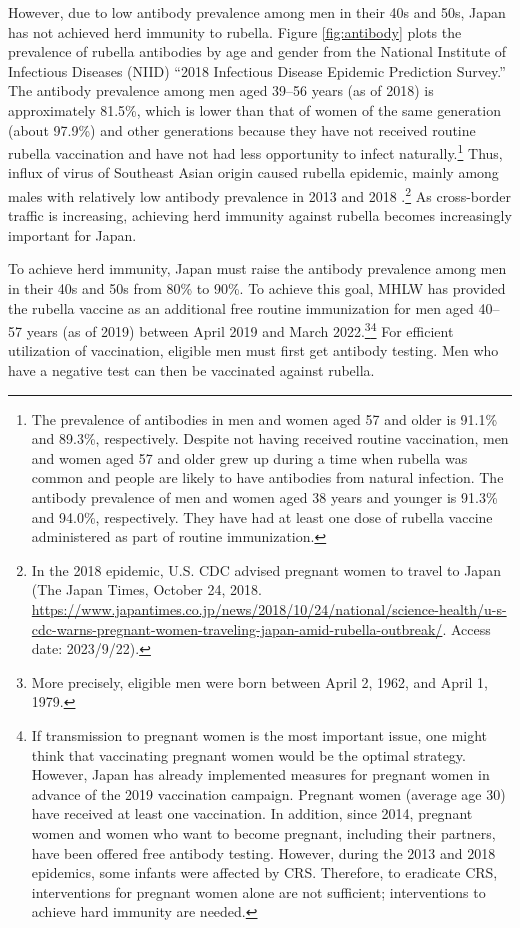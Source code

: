 \documentclass[
]{article}
\begin{document}
However, due to low antibody prevalence among men in their 40s and 50s, Japan has not achieved herd immunity to rubella. Figure \ref{fig:antibody} plots the prevalence of rubella antibodies by age and gender from the National Institute of Infectious Diseases (NIID) ``2018 Infectious Disease Epidemic Prediction Survey.'' The antibody prevalence among men aged 39--56 years (as of 2018) is approximately 81.5\%, which is lower than that of women of the same generation (about 97.9\%) and other generations because they have not received routine rubella vaccination and have not had less opportunity to infect naturally.\footnote{The prevalence of antibodies in men and women aged 57 and older is 91.1\% and 89.3\%, respectively. Despite not having received routine vaccination, men and women aged 57 and older grew up during a time when rubella was common and people are likely to have antibodies from natural infection. The antibody prevalence of men and women aged 38 years and younger is 91.3\% and 94.0\%, respectively. They have had at least one dose of rubella vaccine administered as part of routine immunization.} Thus, influx of virus of Southeast Asian origin caused rubella epidemic, mainly among males with relatively low antibody prevalence in 2013 and 2018 \citep{NIID2019}.\footnote{In the 2018 epidemic, U.S. CDC advised pregnant women to travel to Japan (The Japan Times, October 24, 2018. \url{https://www.japantimes.co.jp/news/2018/10/24/national/science-health/u-s-cdc-warns-pregnant-women-traveling-japan-amid-rubella-outbreak/}. Access date: 2023/9/22).} As cross-border traffic is increasing, achieving herd immunity against rubella becomes increasingly important for Japan.

To achieve herd immunity, Japan must raise the antibody prevalence among men in their 40s and 50s from 80\% to 90\%. To achieve this goal, MHLW has provided the rubella vaccine as an additional free routine immunization for men aged 40--57 years (as of 2019) between April 2019 and March 2022.\footnote{More precisely, eligible men were born between April 2, 1962, and April 1, 1979.}\footnote{If transmission to pregnant women is the most important issue, one might think that vaccinating pregnant women would be the optimal strategy. However, Japan has already implemented measures for pregnant women in advance of the 2019 vaccination campaign. Pregnant women (average age 30) have received at least one vaccination. In addition, since 2014, pregnant women and women who want to become pregnant, including their partners, have been offered free antibody testing. However, during the 2013 and 2018 epidemics, some infants were affected by CRS. Therefore, to eradicate CRS, interventions for pregnant women alone are not sufficient; interventions to achieve hard immunity are needed.} For efficient utilization of vaccination, eligible men must first get antibody testing. Men who have a negative test can then be vaccinated against rubella.
\end{document}
